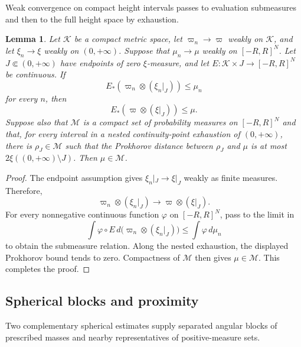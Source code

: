 \documentclass[10pt,a4paper]{amsart}
\numberwithin{equation}{section}
\newtheorem{lemma}[theorem]{Lemma}
\begin{document}
Weak convergence on compact height intervals passes to evaluation submeasures and then to the full height space by exhaustion.

\begin{lemma}\label{lem:compact-profile-passage}
Let $\mathscr K$ be a compact metric space, let $\varpi_n\to\varpi$ weakly on $\mathscr K$, and let $\xi_n\to\xi$ weakly on $(0,+\infty)$.  Suppose that $\mu_n\to\mu$ weakly on $[-R,R]^N$.  Let $J\Subset(0,+\infty)$ have endpoints of zero $\xi$-measure, and let $E\colon\mathscr K\times J\to[-R,R]^N$ be continuous.  If
\[ E_*(\varpi_n\otimes(\xi_n|_J))\le\mu_n \]
for every $n$, then
\[ E_*(\varpi\otimes(\xi|_J))\le\mu. \]
Suppose also that $\mathscr M$ is a compact set of probability measures on $[-R,R]^N$ and that, for every interval in a nested continuity-point exhaustion of $(0,+\infty)$, there is $\rho_J\in\mathscr M$ such that
the Prokhorov distance between $\rho_J$ and $\mu$ is at most
$2\xi((0,+\infty)\setminus J)$.
Then $\mu\in\mathscr M$.
\end{lemma}

\begin{proof}
The endpoint assumption gives $\xi_n|_J\to\xi|_J$ weakly as finite measures.  Therefore,
\[ \varpi_n\otimes(\xi_n|_J) \longrightarrow\varpi\otimes(\xi|_J). \]
For every nonnegative continuous function $\varphi$ on $[-R,R]^N$, pass to the limit in
\[ \int\varphi\circ E\,d\bigl(\varpi_n\otimes(\xi_n|_J)\bigr) \le\int\varphi\,d\mu_n \]
to obtain the submeasure relation.  Along the nested exhaustion, the displayed Prokhorov bound tends to zero.  Compactness of $\mathscr M$ then gives $\mu\in\mathscr M$.
	This completes the proof.
\end{proof}

\subsection{Spherical blocks and proximity}

Two complementary spherical estimates supply separated angular blocks of prescribed masses and nearby representatives of positive-measure sets.
\end{document}
